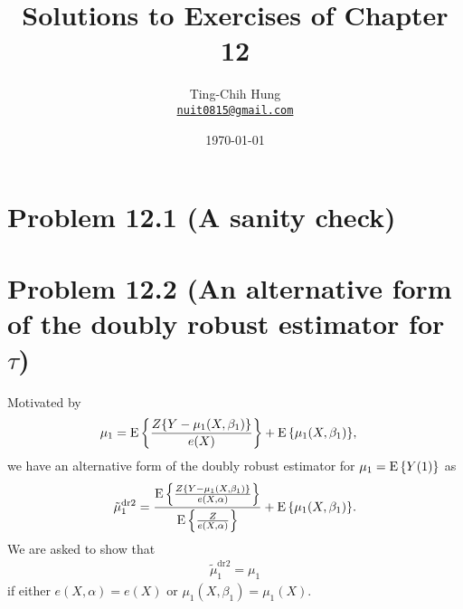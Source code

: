 \documentclass[10pt]{article}
\title{Solutions to Exercises of Chapter 12}
\author{Ting-Chih Hung \\ \href{mailto:nuit0815@gmail.com}{\texttt{nuit0815@gmail.com}}}
\date{\today}
\begin{document}
\maketitle

\section*{Problem 12.1 (A sanity check)}

\section*{Problem 12.2 (An alternative form of the doubly robust estimator for $\tau$)}

Motivated by
\begin{align*}
  \mu_1 &= \operatorname{E}{\left\lbrace \frac{Z{\left\lbrace Y - \mu_1(X, \beta_1) \right\rbrace}}{e(X)} \right\rbrace} + \operatorname{E}{\left\lbrace \mu_1(X, \beta_1) \right\rbrace},
\end{align*}
we have an alternative form of the doubly robust estimator for
$\mu_1 = \operatorname{E}{\left\lbrace Y(1) \right\rbrace}$ as
\begin{align*}
  \tilde{\mu}_1^{\text{dr2}}
  = \frac{\operatorname{E}{\left\lbrace \frac{Z{\left\lbrace Y - \mu_1(X, \beta_1) \right\rbrace}}{e(X, \alpha)} \right\rbrace}}{\operatorname{E}{\left\lbrace \frac{Z}{e(X, \alpha)} \right\rbrace}} + \operatorname{E}{\left\lbrace \mu_1(X, \beta_1) \right\rbrace}.
\end{align*}
We are asked to show that
\begin{align*}
  \tilde{\mu}_1^{\text{dr2}} = \mu_1
\end{align*}
if either $e(X, \alpha) = e(X)$ or $\mu_1(X, \beta_1) = \mu_1(X)$.
\end{document}
